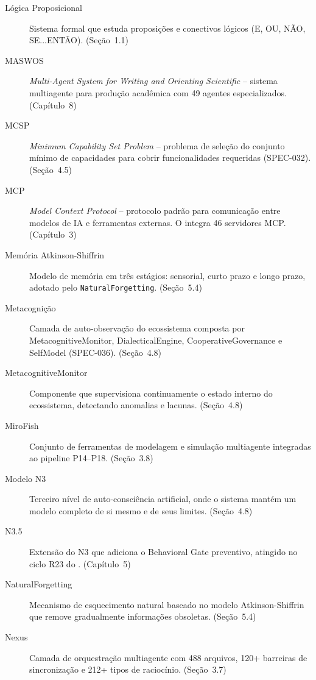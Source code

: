 \begin{description}
\item[Lógica Proposicional] Sistema formal que estuda proposições e
conectivos lógicos (E, OU, NÃO, SE\;...\;ENTÃO). (Seção~1.1)

\item[MASWOS] \emph{Multi-Agent System for Writing and Orienting
Scientific} -- sistema multiagente para produção acadêmica com 49
agentes especializados. (Capítulo~8)

\item[MCSP] \emph{Minimum Capability Set Problem} -- problema de
seleção do conjunto mínimo de capacidades para cobrir funcionalidades
requeridas (SPEC-032). (Seção~4.5)

\item[MCP] \emph{Model Context Protocol} -- protocolo padrão para
comunicação entre modelos de IA e ferramentas externas. O
\opencodeeco{} integra 46 servidores MCP. (Capítulo~3)

\item[Memória Atkinson-Shiffrin] Modelo de memória em três estágios:
sensorial, curto prazo e longo prazo, adotado pelo
\texttt{NaturalForgetting}. (Seção~5.4)

\item[Metacognição] Camada de auto-observação do ecossistema composta
por MetacognitiveMonitor, DialecticalEngine, CooperativeGovernance e
SelfModel (SPEC-036). (Seção~4.8)

\item[MetacognitiveMonitor] Componente que supervisiona continuamente
o estado interno do ecossistema, detectando anomalias e lacunas.
(Seção~4.8)

\item[MiroFish] Conjunto de ferramentas de modelagem e simulação
multiagente integradas ao pipeline P14--P18. (Seção~3.8)

\item[Modelo N3] Terceiro nível de auto-consciência artificial, onde o
sistema mantém um modelo completo de si mesmo e de seus limites.
(Seção~4.8)

\item[N3.5] Extensão do N3 que adiciona o Behavioral Gate preventivo,
atingido no ciclo R23 do \opencodeeco{}. (Capítulo~5)

\item[NaturalForgetting] Mecanismo de esquecimento natural baseado no
modelo Atkinson-Shiffrin que remove gradualmente informações obsoletas.
(Seção~5.4)

\item[Nexus] Camada de orquestração multiagente com 488 arquivos,
120+ barreiras de sincronização e 212+ tipos de raciocínio.
(Seção~3.7)


\end{description}
